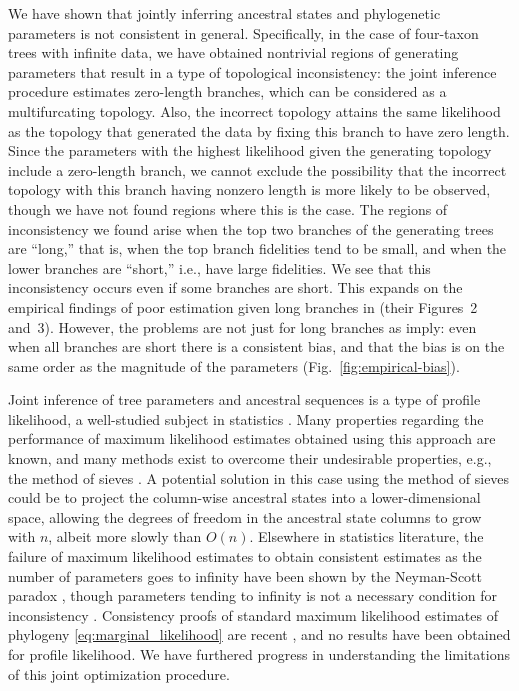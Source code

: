 \documentclass[11pt]{article}
\newcommand{\nCols}{n}
\begin{document}
We have shown that jointly inferring ancestral states and phylogenetic parameters \citep{Sagulenko2018-xl} is not consistent in general.
Specifically, in the case of four-taxon trees with infinite data, we have obtained nontrivial regions of generating parameters that result in a type of topological inconsistency: the joint inference procedure estimates zero-length branches, which can be considered as a multifurcating topology.
Also, the incorrect topology attains the same likelihood as the topology that generated the data by fixing this branch to have zero length.
Since the parameters with the highest likelihood given the generating topology include a zero-length branch, we cannot exclude the possibility that the incorrect topology with this branch having nonzero length is more likely to be observed, though we have not found regions where this is the case.
The regions of inconsistency we found arise when the top two branches of the generating trees are ``long,'' that is, when the top branch fidelities tend to be small, and when the lower branches are ``short,'' i.e., have large fidelities.
We see that this inconsistency occurs even if some branches are short.
This expands on the empirical findings of poor estimation given long branches in \citet{Sagulenko2018-xl} (their Figures~2 and~3).
However, the problems are not just for long branches as \citet{Sagulenko2018-xl} imply: even when all branches are short there is a consistent bias, and that the bias is on the same order as the magnitude of the parameters (Fig.~\ref{fig:empirical-bias}).

Joint inference of tree parameters and ancestral sequences is a type of profile likelihood, a well-studied subject in statistics \citep{Murphy2000-ry}.
Many properties regarding the performance of maximum likelihood estimates obtained using this approach are known, and many methods exist to overcome their undesirable properties, e.g., the method of sieves \citep{Geman1982}.
A potential solution in this case using the method of sieves could be to project the column-wise ancestral states into a lower-dimensional space, allowing the degrees of freedom in the ancestral state columns to grow with $\nCols$, albeit more slowly than $O(\nCols)$.
Elsewhere in statistics literature, the failure of maximum likelihood estimates to obtain consistent estimates as the number of parameters goes to infinity have been shown by the Neyman-Scott paradox \citep{Neyman1948-tt}, though parameters tending to infinity is not a necessary condition for inconsistency \citep{LeCam1990}.
Consistency proofs of standard maximum likelihood estimates of phylogeny \eqref{eq:marginal_likelihood} are recent \citep{Allman2008-wd,Chai2011-ff,RoyChoudhury2015-ta}, and no results have been obtained for profile likelihood.
We have furthered progress in understanding the limitations of this joint optimization procedure.
\end{document}
